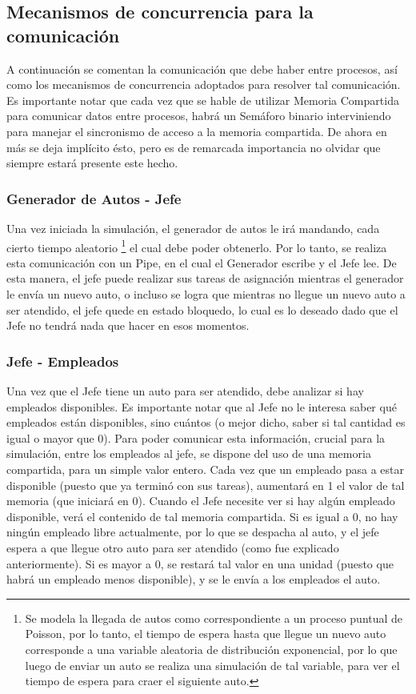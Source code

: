\documentclass[a4paper,12pt]{article}
\begin{document}
\subsection{Mecanismos de concurrencia para la comunicación}
A continuación se comentan la comunicación que debe haber entre procesos, así como los mecanismos de concurrencia adoptados para resolver tal comunicación. Es importante notar que cada vez que se hable de utilizar Memoria Compartida para comunicar datos entre procesos, habrá un Semáforo binario interviniendo para manejar el sincronismo de acceso a la memoria compartida. De ahora en más se deja implícito ésto, pero es de remarcada importancia no olvidar que siempre estará presente este hecho.

\subsubsection{Generador de Autos - Jefe}
Una vez iniciada la simulación, el generador de autos le irá mandando, cada cierto tiempo aleatorio \footnote{Se modela la llegada de autos como correspondiente a un proceso puntual de Poisson, por lo tanto, el tiempo de espera hasta que llegue un nuevo auto corresponde a una variable aleatoria de distribución exponencial, por lo que luego de enviar un auto se realiza una simulación de tal variable, para ver el tiempo de espera para craer el siguiente auto.}
el cual debe poder obtenerlo. Por lo tanto, se realiza esta comunicación con un Pipe, en el cual el Generador escribe y el Jefe lee. De esta manera, el jefe puede realizar sus tareas de asignación mientras el generador le envía un nuevo auto, o incluso se logra que mientras no llegue un nuevo auto a ser atendido, el jefe quede en estado bloquedo, lo cual es lo deseado dado que el Jefe no tendrá nada que hacer en esos momentos.

\subsubsection{Jefe - Empleados}
Una vez que el Jefe tiene un auto para ser atendido, debe analizar si hay empleados disponibles. Es importante notar que al Jefe no le interesa saber qué empleados están disponibles, sino cuántos (o mejor dicho, saber si tal cantidad es igual o mayor que 0). Para poder comunicar esta información, crucial para la simulación, entre los empleados al jefe, se dispone del uso de una memoria compartida, para un simple valor entero. Cada vez que un empleado pasa a estar disponible (puesto que ya terminó con sus tareas), aumentará en 1 el valor de tal memoria (que iniciará en 0). Cuando el Jefe necesite ver si hay algún empleado disponible, verá el contenido de tal memoria compartida. Si es igual a 0, no hay ningún empleado libre actualmente, por lo que se despacha al auto, y el jefe espera a que llegue otro auto para ser atendido (como fue explicado anteriormente). Si es mayor a 0, se restará tal valor en una unidad (puesto que habrá un empleado menos disponible), y se le envía a los empleados el auto. 
\end{document}
